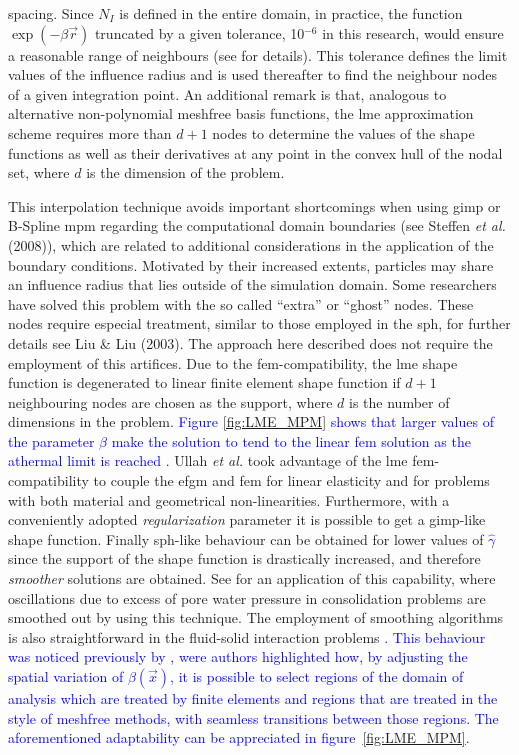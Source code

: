 \documentclass[preprint,12pt,a4paper]{elsarticle}
\begin{document}
spacing. 
Since $N_I$ is defined in the entire domain, in practice, the
function $\exp(-\beta \vec{r} )$ truncated  by  a given tolerance, 10$^{-6}$ in this research,  would ensure a reasonable range of neighbours (see \cite{Arroyo2006} for details).
This tolerance defines the limit values of the influence radius and is used thereafter to find the neighbour nodes of a given integration point. An additional remark is that, analogous to alternative non-polynomial meshfree basis functions, the \acrshort{lme} approximation scheme requires more than $d+1$ nodes to determine the values of the shape functions as well as their derivatives at any point in the convex hull of the nodal set, where $d$ is the dimension of the problem.

This interpolation technique avoids important shortcomings when using
\acrshort{gimp} or B-Spline \acrshort{mpm} regarding the computational domain boundaries (see Steffen {\it et al.} (2008)\cite{Steffen2008b}), which are related to additional considerations in the application of the boundary
conditions. Motivated by their increased extents, particles may share an influence radius that lies outside of the simulation domain. Some researchers have solved this problem with the so called ``extra'' or ``ghost'' nodes. These nodes require especial treatment, similar to those employed in the \acrfull{sph}, for
further details see Liu \& Liu (2003)\cite{Liu2003}. The approach here described does not require the employment of this artifices.
Due to the \acrshort{fem}-compatibility, the \acrshort{lme} shape
function is degenerated to linear finite element shape function if $d+1$ neighbouring nodes are chosen as the support, where $d$ is the number of dimensions in the problem. \textcolor{blue}{Figure \ref{fig:LME_MPM} shows that larger values of the parameter $\beta$ make the solution to tend to the linear \acrshort{fem} solution as the athermal limit is reached \cite{Arroyo2006}}. Ullah {\it et al.} \cite{Augarde_2013} took advantage of the \acrshort{lme} \acrshort{fem}-compatibility to couple the \acrfull{efgm} and \acrshort{fem} for linear elasticity and for problems with both material and geometrical non-linearities. Furthermore, with a conveniently adopted \textit{regularization} parameter it is possible to get a \acrshort{gimp}-like shape function. Finally \acrshort{sph}-like behaviour can be obtained for lower values of \textcolor{blue}{$\widehat{\gamma}$} since the support of the shape function is drastically increased, and therefore \textit{smoother} solutions are obtained. See \cite{Navas2016} for an application of this capability, where oscillations due to excess of pore water pressure in consolidation problems are smoothed out by using this technique. The employment of smoothing algorithms is also straightforward in the fluid-solid interaction problems \cite{Arduino_2018}. \textcolor{blue}{This behaviour was noticed previously by \cite{Arroyo2006}, were authors highlighted how, by adjusting the spatial variation of $\beta(\vec{x})$, it is possible to select regions of the domain of analysis which are treated by finite elements and regions that are treated in the style of meshfree methods, with seamless transitions between those regions. The aforementioned adaptability can be appreciated in figure~\ref{fig:LME_MPM}.} \\
\end{document}
